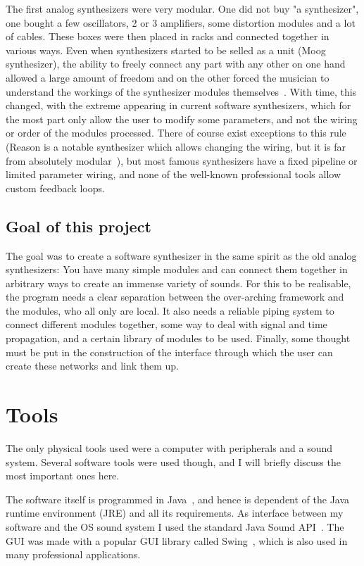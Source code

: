 \documentclass[11pt,a4paper]{article}
\begin{document}
The first analog synthesizers were very modular. One did not buy "a synthesizer", one bought a few oscillators, 2 or 3 amplifiers, some distortion modules and a lot of cables. These boxes were then placed in racks and connected together in various ways. Even when synthesizers started to be selled as a unit (Moog synthesizer), the ability to freely connect any part with any other on one hand allowed a large amount of freedom and on the other forced the musician to understand the workings of the synthesizer modules themselves~\cite{ModularMoog}. With time, this changed, with the extreme appearing in current software synthesizers, which for the most part only allow the user to modify some parameters, and not the wiring or order of the modules processed. There of course exist exceptions to this rule (Reason is a notable synthesizer which allows changing the wiring, but it is far from absolutely modular~\cite{Reason}), but most famous synthesizers have a fixed pipeline or limited parameter wiring, and none of the well-known professional tools allow custom feedback loops.

\subsection{Goal of this project}

The goal was to create a software synthesizer in the same spirit as the old analog synthesizers: You have many simple modules and can connect them together in arbitrary ways to create an immense variety of sounds. For this to be realisable, the program needs a clear separation between the over-arching framework and the modules, who all only are local. It also needs a reliable piping system to connect different modules together, some way to deal with signal and time propagation, and a certain library of modules to be used. Finally, some thought must be put in the construction of the interface through which the user can create these networks and link them up.

\section{Tools}

The only physical tools used were a computer with peripherals and a sound system. Several software tools were used though, and I will briefly discuss the most important ones here.

The software itself is programmed in Java~\cite{Java}, and hence is dependent of the Java runtime environment (JRE) and all its requirements. As interface between my software and the OS sound system I used the standard Java Sound API~\cite{Javasound}. The GUI was made with a popular GUI library called Swing~\cite{Swing}, which is also used in many professional applications.
\end{document}
